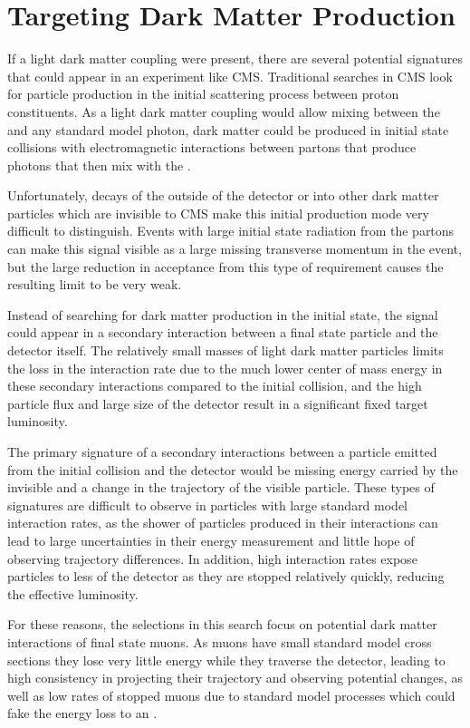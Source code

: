 \section{Targeting Dark Matter Production}
If a light dark matter coupling were present, there are several potential signatures that could appear in an experiment like CMS.
Traditional searches in CMS look for particle production in the initial scattering process between proton constituents.
As a light dark matter coupling would allow mixing between the \aprime and any standard model photon, dark matter could be produced in initial state collisions with electromagnetic interactions between partons that produce photons that then mix with the \aprime.

Unfortunately, decays of the \aprime outside of the detector or into other dark matter particles which are invisible to CMS make this initial production mode very difficult to distinguish.
Events with large initial state radiation from the partons can make this signal visible as a large missing transverse momentum in the event, but the large reduction in acceptance from this type of requirement causes the resulting limit to be very weak.

Instead of searching for dark matter production in the initial state, the signal could appear in a secondary interaction between a final state particle and the detector itself.
The relatively small masses of light dark matter particles limits the loss in the interaction rate due to the much lower center of mass energy in these secondary interactions compared to the initial collision, and the high particle flux and large size of the detector result in a significant fixed target luminosity.

The primary signature of a secondary interactions between a particle emitted from the initial collision and the detector would be missing energy carried by the invisible \aprime and a change in the trajectory of the visible particle.
These types of signatures are difficult to observe in particles with large standard model interaction rates, as the shower of particles produced in their interactions can lead to large uncertainties in their energy measurement and little hope of observing trajectory differences.
In addition, high interaction rates expose particles to less of the detector as they are stopped relatively quickly, reducing the effective luminosity.

For these reasons, the selections in this search focus on potential dark matter interactions of final state muons.
As muons have small standard model cross sections they lose very little energy while they traverse the detector, leading to high consistency in projecting their trajectory and observing potential changes, as well as low rates of stopped muons due to standard model processes which could fake the energy loss to an \aprime.

